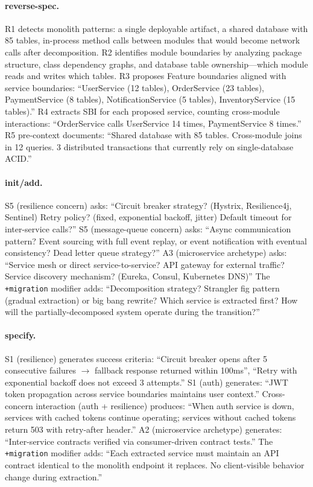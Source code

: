 \documentclass[11pt,a4paper,openright,twoside]{report}
\begin{document}
\paragraph{reverse-spec.}
R1 detects monolith patterns: a single deployable artifact, a shared database with 85 tables, in-process method calls between modules that would become network calls after decomposition. R2 identifies module boundaries by analyzing package structure, class dependency graphs, and database table ownership---which module reads and writes which tables. R3 proposes Feature boundaries aligned with service boundaries: ``UserService (12 tables), OrderService (23 tables), PaymentService (8 tables), NotificationService (5 tables), InventoryService (15 tables).'' R4 extracts SBI for each proposed service, counting cross-module interactions: ``OrderService calls UserService 14 times, PaymentService 8 times.'' R5 pre-context documents: ``Shared database with 85 tables. Cross-module joins in 12 queries. 3 distributed transactions that currently rely on single-database ACID.''

\paragraph{init/add.}
S5 (resilience concern) asks: ``Circuit breaker strategy? (Hystrix, Resilience4j, Sentinel) Retry policy? (fixed, exponential backoff, jitter) Default timeout for inter-service calls?'' S5 (message-queue concern) asks: ``Async communication pattern? Event sourcing with full event replay, or event notification with eventual consistency? Dead letter queue strategy?'' A3 (microservice archetype) asks: ``Service mesh or direct service-to-service? API gateway for external traffic? Service discovery mechanism? (Eureka, Consul, Kubernetes DNS)'' The \texttt{+migration} modifier adds: ``Decomposition strategy? Strangler fig pattern (gradual extraction) or big bang rewrite? Which service is extracted first? How will the partially-decomposed system operate during the transition?''

\paragraph{specify.}
S1 (resilience) generates success criteria: ``Circuit breaker opens after 5 consecutive failures $\to$ fallback response returned within 100ms'', ``Retry with exponential backoff does not exceed 3 attempts.'' S1 (auth) generates: ``JWT token propagation across service boundaries maintains user context.'' Cross-concern interaction (auth + resilience) produces: ``When auth service is down, services with cached tokens continue operating; services without cached tokens return 503 with retry-after header.'' A2 (microservice archetype) generates: ``Inter-service contracts verified via consumer-driven contract tests.'' The \texttt{+migration} modifier adds: ``Each extracted service must maintain an API contract identical to the monolith endpoint it replaces. No client-visible behavior change during extraction.''
\end{document}
